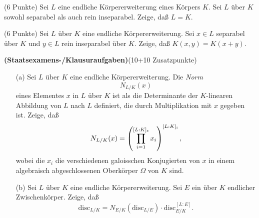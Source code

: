 \documentclass{algsheet}
\begin{document}
\begin{exercise}(6 Punkte)\newline
	Sei \(L\) eine endliche Körpererweiterung eines Körpers \(K\). Sei \(L\)
	über \(K\) sowohl separabel als auch rein inseparabel. Zeige, daß \(L = K\).
\end{exercise}

\begin{exercise}(6 Punkte)\newline
	Sei \(L\) über \(K\) eine endliche Körpererweiterung. Sei \(x \in L\) separabel
	über \(K\) und \(y \in L\) rein inseparabel über \(K\). Zeige, daß
	\(K(x, y) = K(x + y)\).
\end{exercise}



\begin{exercise}\textbf{(Staatsexamens-/Klausuraufgaben)}(10+10 Zusatzpunkte)\vspace{-1ex}
   \begin{itemize}
       \item[(a)] Sei \(L\) über \(K\) eine endliche Körpererweiterung. Die \emph{Norm}
	\begin{equation}
		N_{L/K}(x)
	\end{equation}
	eines Elementes \(x\) in \(L\) über \(K\) ist als die Determinante der
	\(K\)-linearen Abbildung von \(L\) nach \(L\) definiert, die durch Multiplikation mit
	\(x\) gegeben ist. Zeige, daß
	\begin{equation}
		N_{L/K}(x) = \left(\prod_{i = 1}^{[L : K]_{\mathrm{s}}} x_i\right)^{[L : K]_\mathrm i},
	\end{equation}
	wobei die \(x_i\) die verschiedenen galoisschen Konjugierten von \(x\) in
	einem algebraisch abgeschlossenen Oberkörper \(\Omega\) von \(K\) sind.
      
       \item[(b)] Sei \(L\) über \(K\) eine endliche Körpererweiterung. Sei \(E\) ein über \(K\)
	endlicher Zwischenkörper. Zeige, daß
	\begin{equation}
		\mathrm{disc}_{L/K} = N_{E/K}(\mathrm{disc}_{L/E}) \cdot \mathrm{disc}_{E/K}^{[L : E]}.
	\end{equation}
   \end{itemize}
\end{exercise}
\end{document}
